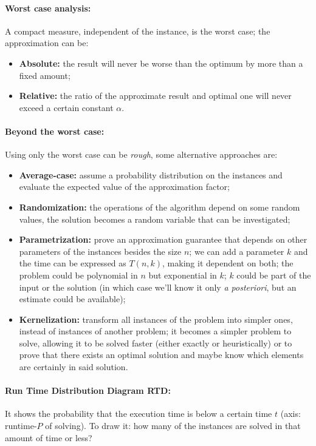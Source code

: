 \documentclass{article}
\begin{document}
	\paragraph{Worst case analysis:} A compact measure, independent of the instance, is the worst case; the approximation can be: 
	\begin{itemize}
		\item \textbf{Absolute:} the result will never be worse than the optimum by more than a fixed amount;
		\item\textbf{Relative:} the ratio of the approximate result and optimal one will never exceed a certain constant $\alpha$.\\
	\end{itemize}
	
	\paragraph{Beyond the worst case:} Using only the worst case can be \textit{rough}, some alternative approaches are: 
	\begin{itemize}
		\item \textbf{Average-case:} assume a probability distribution on the instances and evaluate the expected value of the approximation factor;
		\item \textbf{Randomization:} the operations of the algorithm depend on some random values, the solution becomes a random variable that can be investigated;
		\item \textbf{Parametrization:} prove an approximation guarantee that depends on other parameters of the instances besides the size $n$; we can add a parameter $k$ and the time can be expressed as $T(n,k)$, making it dependent on both; the problem could be polynomial in $n$ but exponential in $k$; $k$ could be part of the input or the solution (in which case we'll know it only \textit{a posteriori}, but an estimate could be available); 
		\item \textbf{Kernelization:} transform all instances of the problem into simpler ones, instead of instances of another problem; it becomes a simpler problem to solve, allowing it to be solved faster (either exactly or heuristically) or to prove that there exists an optimal solution  and maybe know which elements are certainly in said solution.\\
	\end{itemize}
	
	\paragraph{Run Time Distribution Diagram RTD:} It shows the probability that the execution time is below a certain time $t$ (axis: runtime-$P$ of solving). To draw it: how many of the instances are solved in that amount of time or less?\\
	
\end{document}
